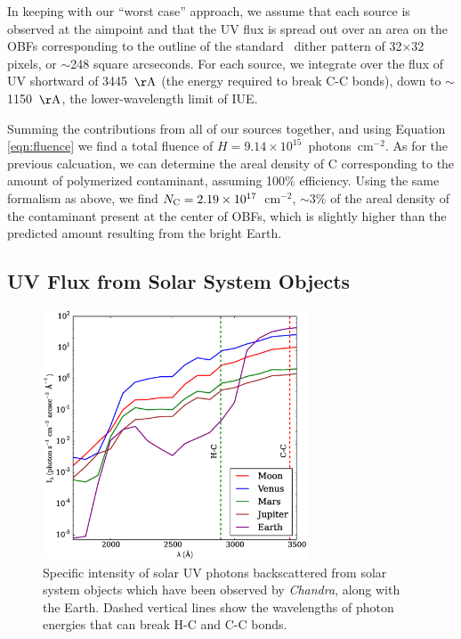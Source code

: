 \documentclass[11pt]{article}
\begin{document}


In keeping with our ``worst case'' approach, we assume that each source is observed at the aimpoint and that the UV
flux is spread out over an area on the OBFs corresponding to the outline of the standard \chandra~dither pattern of
32$\times$32 pixels, or $\sim$248 square arcseconds. For each source, we integrate over the flux of UV shortward of
3445~${\rm \AA}$ (the energy required to break C-C bonds), down to $\sim$1150~${\rm \AA}$, the lower-wavelength limit
of IUE.

Summing the contributions from all of our sources together, and using Equation \ref{eqn:fluence} we find a total
fluence of $H = 9.14 \times 10^{15}$~photons~cm$^{-2}$. As for the previous calcuation, we can determine the areal
density of C corresponding to the amount of polymerized contaminant, assuming 100\% efficiency. Using the same formalism
as above, we find $N_{\rm C} = 2.19 \times 10^{17}$~cm$^{-2}$, $\sim$3\% of the areal density of the contaminant present
at the center of OBFs, which is slightly higher than the predicted amount resulting from the bright Earth.

\subsection{UV Flux from Solar System Objects}

\begin{figure}
\begin{center}
\includegraphics[width=0.7\textwidth]{ss_obj_intensity.eps}
\caption{Specific intensity of solar UV photons backscattered from solar system objects which have been observed by
{\it Chandra}, along with the Earth. Dashed vertical lines show the wavelengths of photon energies that can break H-C
and C-C bonds.\label{fig:ss_obj_intensity}}
\end{center}
\end{figure}
\end{document}
